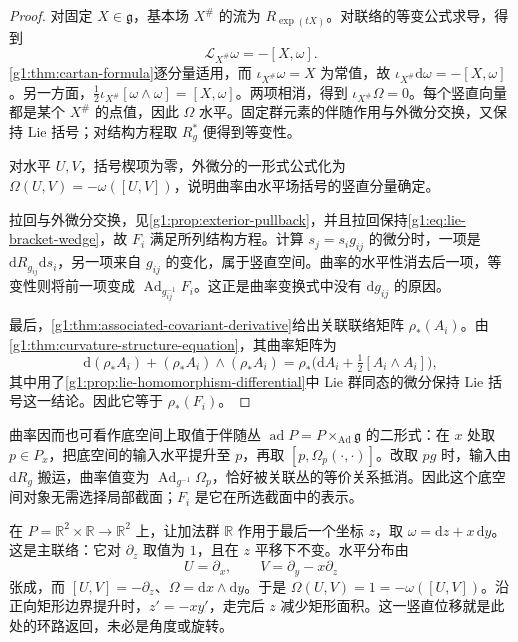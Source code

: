 \begin{proof}
	对固定 \(X\in\mathfrak g\)，基本场 \(X^\#\) 的流为 \(R_{\exp(tX)}\)。对联络的等变公式求导，得到
	\[
		\mathcal L_{X^\#}\omega=-[X,\omega].
	\]
	\cref{g1:thm:cartan-formula}逐分量适用，而 \(\iota_{X^\#}\omega=X\) 为常值，故 \(\iota_{X^\#}\mathrm{d}\omega=-[X,\omega]\)。另一方面，\(\tfrac12\iota_{X^\#}[\omega\wedge\omega]=[X,\omega]\)。两项相消，得到 \(\iota_{X^\#}\Omega=0\)。每个竖直向量都是某个 \(X^\#\) 的点值，因此 \(\Omega\) 水平。固定群元素的伴随作用与外微分交换，又保持 Lie 括号；对结构方程取 \(R_g^*\) 便得到等变性。

	对水平 \(U,V\)，括号楔项为零，外微分的一形式公式化为 \(\Omega(U,V)=-\omega([U,V])\)，说明曲率由水平场括号的竖直分量确定。

	拉回与外微分交换，见\cref{g1:prop:exterior-pullback}，并且拉回保持\eqref{g1:eq:lie-bracket-wedge}，故 \(F_i\) 满足所列结构方程。计算 \(s_j=s_i g_{ij}\) 的微分时，一项是 \(\mathrm{d}R_{g_{ij}}\mathrm{d}s_i\)，另一项来自 \(g_{ij}\) 的变化，属于竖直空间。曲率的水平性消去后一项，等变性则将前一项变成 \(\operatorname{Ad}_{g_{ij}^{-1}}F_i\)。这正是曲率变换式中没有 \(\mathrm{d}g_{ij}\) 的原因。

	最后，\cref{g1:thm:associated-covariant-derivative}给出关联联络矩阵 \(\rho_*(A_i)\)。由\cref{g1:thm:curvature-structure-equation}，其曲率矩阵为
	\[
		\mathrm{d}(\rho_*A_i)+(\rho_*A_i)\wedge(\rho_*A_i)
		=\rho_*\bigl(\mathrm{d}A_i+\tfrac12[A_i\wedge A_i]\bigr),
	\]
	其中用了\cref{g1:prop:lie-homomorphism-differential}中 Lie 群同态的微分保持 Lie 括号这一结论。因此它等于 \(\rho_*(F_i)\)。
\end{proof}

曲率因而也可看作底空间上取值于伴随丛 \(\operatorname{ad}P=P\times_{\operatorname{Ad}}\mathfrak g\) 的二形式：在 \(x\) 处取 \(p\in P_x\)，把底空间的输入水平提升至 \(p\)，再取 \([p,\Omega_p(\cdot,\cdot)]\)。改取 \(pg\) 时，输入由 \(\mathrm{d}R_g\) 搬运，曲率值变为 \(\operatorname{Ad}_{g^{-1}}\Omega_p\)，恰好被关联丛的等价关系抵消。因此这个底空间对象无需选择局部截面；\(F_i\) 是它在所选截面中的表示。

\begin{example}\label{g1:exm:principal-additive-curvature}
	在 \(P=\mathbb R^2\times\mathbb R\to\mathbb R^2\) 上，让加法群 \(\mathbb R\) 作用于最后一个坐标 \(z\)，取 \(\omega=\mathrm{d}z+x\,\mathrm{d}y\)。这是主联络：它对 \(\partial_z\) 取值为 \(1\)，且在 \(z\) 平移下不变。水平分布由
	\[
		U=\partial_x,\qquad V=\partial_y-x\partial_z
	\]
	张成，而 \([U,V]=-\partial_z\)、\(\Omega=\mathrm{d}x\wedge\mathrm{d}y\)。于是 \(\Omega(U,V)=1=-\omega([U,V])\)。沿正向矩形边界提升时，\(z'=-x y'\)，走完后 \(z\) 减少矩形面积。这一竖直位移就是此处的环路返回，未必是角度或旋转。
\end{example}

